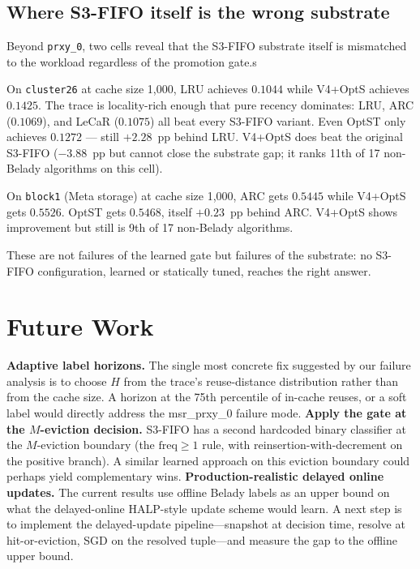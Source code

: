 \documentclass[letterpaper,twocolumn,10pt]{article}
\begin{document}
\subsection{Where S3-FIFO itself is the wrong substrate}

Beyond \texttt{prxy\_0}, two cells reveal that the S3-FIFO substrate itself is mismatched to the workload regardless of the promotion gate.s

On \texttt{cluster26} at cache size 1{,}000, LRU achieves $0.1044$ while V4+OptS achieves $0.1425$. The trace is locality-rich enough that pure recency dominates: LRU, ARC ($0.1069$), and LeCaR ($0.1075$) all beat every S3-FIFO variant. Even OptST only achieves $0.1272$ --- still $+2.28$~pp behind LRU. V4+OptS does beat the original S3-FIFO ($-3.88$~pp but cannot close the substrate gap; it ranks 11th of 17 non-Belady algorithms on this cell).

On \texttt{block1} (Meta storage) at cache size 1{,}000, ARC gets $0.5445$ while V4+OptS gets $0.5526$. OptST gets $0.5468$, itself $+0.23$~pp behind ARC. V4+OptS shows improvement but still is 9th of 17 non-Belady algorithms.

These are not failures of the learned gate but failures of the substrate: no S3-FIFO configuration, learned or statically tuned, reaches the right answer. 

\section{Future Work}
\textbf{Adaptive label horizons.} The single most concrete fix
suggested by our failure analysis is to choose $H$ from the trace's
reuse-distance distribution rather than from the cache size. A
horizon at the 75th percentile of in-cache reuses, or a soft label
would directly address the
msr\_prxy\_0 failure mode. 
\textbf{Apply the gate at the $M$-eviction decision.} S3-FIFO has
a second hardcoded binary classifier at the $M$-eviction boundary
(the $\textrm{freq} \geq 1$ rule, with reinsertion-with-decrement
on the positive branch). A similar learned approach on this eviction boundary could perhaps yield complementary wins. 
\textbf{Production-realistic delayed online updates.} The current
results use offline Belady labels as an upper bound on what the
delayed-online HALP-style update scheme would learn. A next step is to implement the delayed-update
pipeline---snapshot at decision time, resolve at hit-or-eviction,
SGD on the resolved tuple---and measure the gap to the offline
upper bound.
\end{document}
